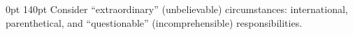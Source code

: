 \documentclass{article}
\begin{document}
 0pt 140pt Consider ``extraordinary'' (unbelievable) circumstances: international, parenthetical, and ``questionable'' (incomprehensible) responsibilities.
\end{document}
